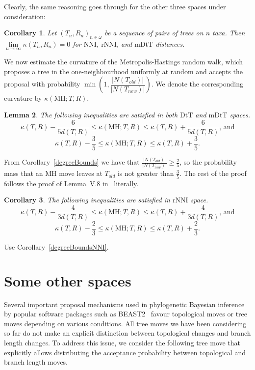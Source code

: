 \documentclass{amsart}
\newtheorem{lemma}{Lemma}
\newtheorem{corollary}[lemma]{Corollary}
\newcommand{\dts}{\mathrm{DtT}}
\newcommand{\nni}{\mathrm{NNI}}
\newcommand{\rnni}{\mathrm{rNNI}}
\newcommand{\mdts}{\mathrm{mDtT}}
\newcommand{\MH}{\mathrm{MH}}
\begin{document}
Clearly, the same reasoning goes through for the other three spaces under consideration:

\begin{corollary}
Let $(T_n,R_n)_{n\in\omega}$ be a sequence of pairs of trees on $n$ taxa.
Then $\lim\limits_{n \to \infty}\kappa(T_n,R_n) = 0$ for $\nni$, $\rnni$, and $\mdts$ distances.
\end{corollary}

We now estimate the curvature of the Metropolis-Hastings random walk, which
proposes a tree in the one-neighbourhood uniformly at random and
accepts the proposal with probability
$\min\left(1, \dfrac{|N(T_{old})|}{|N(T_{new})|}\right)$. We denote the corresponding
curvature by $\kappa(\MH;T,R)$.

\begin{lemma}
The following inequalities are satisfied in both $\dts$ and $\mdts$ spaces.
\[
\kappa(T,R) - \dfrac{6}{5d(T,R)} \leq \kappa(\MH;T,R) \leq \kappa(T,R) +
\dfrac{6}{5d(T,R)}\mbox{, and}
\]
\[
\kappa(T,R) - \dfrac35 \leq \kappa(\MH;T,R) \leq \kappa(T,R) + \dfrac35.
\]
\end{lemma}

\proof
From Corollary~\ref{degreeBounds} we have that
$\frac{|N(T_{old})|}{|N(T_{new})|} \geq \frac{2}{5}$, so the probability
mass that an MH move leaves at $T_{old}$ is not greater than $\frac35$.
The rest of the
proof follows the proof of Lemma~V.8 in~\cite{Whidden2015-es} literally.
\endproof

\begin{corollary}
The following inequalities are satisfied in $\rnni$  space.
\[
\kappa(T,R) - \dfrac{4}{3d(T,R)} \leq \kappa(\MH;T,R) \leq \kappa(T,R) +
\dfrac{4}{3d(T,R)}\mbox{, and}
\]
\[
\kappa(T,R) - \dfrac23 \leq \kappa(\MH;T,R) \leq \kappa(T,R) + \dfrac23.
\]
\end{corollary}

\proof
Use Corollary~\ref{degreeBoundsNNI}.
\endproof

\section{Some other spaces}

Several important proposal mechanisms used in phylogenetic Bayesian inference by
popular software packages such as BEAST2~\cite{beast2} favour topological moves
or tree moves depending on various conditions. All tree moves we have been
considering so far do not make an explicit distinction between topological
changes and branch length changes. To address this issue, we
consider the
following tree move that explicitly allows distributing the acceptance
probability between topological and branch length moves.
\end{document}
